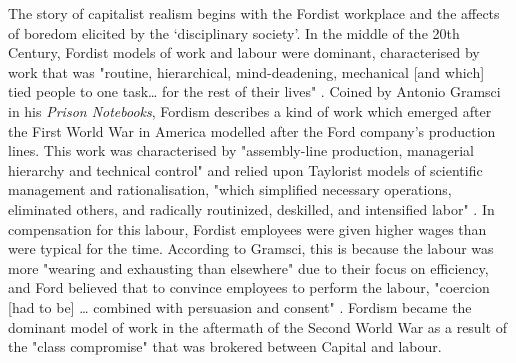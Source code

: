 The story of capitalist realism begins with the Fordist workplace and the affects of boredom elicited by the `disciplinary society'. In the middle of the 20th Century, Fordist models of work and labour were dominant, characterised by work that was "routine, hierarchical, mind-deadening, mechanical [and which] tied people to one task\ldots{} for the rest of their lives" \citep[p. 51]{horgan_lost_2021}. Coined by Antonio Gramsci in his \emph{Prison Notebooks}, Fordism describes a kind of work which emerged after the First World War in America modelled after the Ford company's production lines. This work was characterised by "assembly-line production, managerial hierarchy and technical control" and relied upon Taylorist models of scientific management and rationalisation, "which simplified necessary operations, eliminated others, and radically routinized, deskilled, and intensified labor" \citep[p. 34]{antonio_new_2000}. In compensation for this labour, Fordist employees were given higher wages than were typical for the time. According to Gramsci, this is because the labour was more "wearing and exhausting than elsewhere" \citeyearpar[pp. 311–312]{gramsci_selections_2007} due to their focus on efficiency, and Ford believed that to convince employees to perform the labour, "coercion [had to be] \ldots{} combined with persuasion and consent" \citeyearpar[p. 310]{gramsci_selections_2007}. Fordism became the dominant model of work in the aftermath of the Second World War as a result of the "class compromise" \citep[p. 10]{harvey_brief_2007} that was brokered between Capital and labour. 

